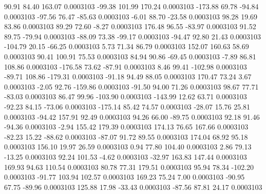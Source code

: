        90.91       84.40      163.07     0.0003103
      -99.38      101.99      170.24     0.0003103
     -173.88       69.78      -94.84     0.0003103
      -97.56       76.47      -85.63     0.0003103
       -6.01       88.70      -23.58     0.0003103
       98.28       19.69       83.86     0.0003103
       89.29       72.60       -8.27     0.0003103
      176.48       96.55      -83.97     0.0003103
       91.52       89.75      -79.94     0.0003103
      -88.09       73.38      -99.17     0.0003103
      -94.47       92.80       21.43     0.0003103
     -104.79       20.15      -66.25     0.0003103
        5.73       71.34       86.79     0.0003103
      152.07      160.63       58.69     0.0003103
       90.41      100.91       75.53     0.0003103
       84.94       90.86      -69.45     0.0003103
       -7.89       86.81      108.86     0.0003103
     -176.58       73.62      -87.91     0.0003103
        8.46       99.41     -102.98     0.0003103
      -89.71      108.86     -179.31     0.0003103
      -91.18       94.49       88.05     0.0003103
      170.47       73.24        3.67     0.0003103
       -2.05       92.76     -159.86     0.0003103
      -91.50       94.00       71.26     0.0003103
       98.67       77.71      -83.03     0.0003103
       86.47       99.96     -103.90     0.0003103
     -143.99       12.62       63.71     0.0003103
      -92.23       84.15      -73.06     0.0003103
     -175.14       85.42       74.57     0.0003103
      -28.07       15.76       25.81     0.0003103
      -94.42      157.91       92.49     0.0003103
       94.26       66.00      -89.75     0.0003103
       92.18       91.46      -94.36     0.0003103
       -2.94      155.42      179.39     0.0003103
      174.13       76.65      167.66     0.0003103
      -82.23       15.22      -88.62     0.0003103
      -87.07       91.72       89.55     0.0003103
      174.04       68.92       95.18     0.0003103
      156.10       19.97       26.59     0.0003103
        0.94       77.80      104.40     0.0003103
        2.86       79.13      -13.25     0.0003103
       92.24      101.53       -4.62     0.0003103
      -32.97      163.83      147.44     0.0003103
      169.93       94.63      110.54     0.0003103
       80.78       77.31      179.51     0.0003103
       95.94       78.34     -102.20     0.0003103
      -91.77      103.94      102.57     0.0003103
      169.23       75.24        7.00     0.0003103
      -90.95       67.75      -89.96     0.0003103
      125.88       17.98      -33.43     0.0003103
      -87.56       87.81       24.17     0.0003103
